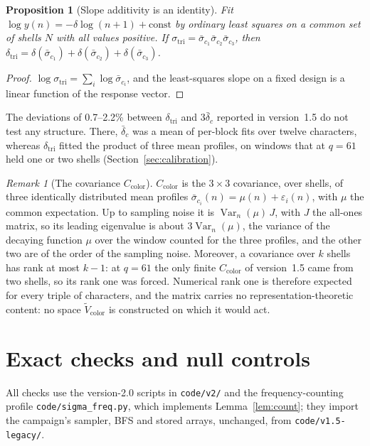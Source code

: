\documentclass[12pt,a4paper]{article}
\newtheorem{proposition}[theorem]{Proposition}
\theoremstyle{definition}
\theoremstyle{remark}
\newtheorem{remark}[theorem]{Remark}
\newcommand{\dtri}{\delta_{\mathrm{tri}}}
\newcommand{\Ccol}{C_{\mathrm{color}}}
\begin{document}
  \begin{proposition}[Slope additivity is an identity]
    \label{prop:ols}
    Fit $\log y(n)=-\delta\log(n+1)+\mathrm{const}$ by ordinary least squares on a common set of
    shells $N$ with all values positive.
    If $\sigma_{\mathrm{tri}}=\bar\sigma_{c_1}\bar\sigma_{c_2}\bar\sigma_{c_3}$, then
    $\dtri=\delta(\bar\sigma_{c_1})+\delta(\bar\sigma_{c_2})+\delta(\bar\sigma_{c_3})$.
  \end{proposition}

  \begin{proof}
    $\log\sigma_{\mathrm{tri}}=\sum_i\log\bar\sigma_{c_i}$, and the least-squares slope on a fixed
    design is a linear function of the response vector.
  \end{proof}

  The deviations of 0.7--2.2\% between $\dtri$ and $3\bar\delta_c$ reported in version~1.5 do
  not test any structure.
  There, $\bar\delta_c$ was a mean of per-block fits over twelve characters, whereas $\dtri$
  fitted the product of three mean profiles, on windows that at $q=61$ held one or two shells
  (Section~\ref{sec:calibration}).

  \begin{remark}[The covariance $\Ccol$]
    \label{rmk:ccol}
    $\Ccol$ is the $3\times3$ covariance, over shells, of three identically distributed mean
    profiles $\bar\sigma_{c_i}(n)=\mu(n)+\varepsilon_i(n)$, with $\mu$ the common expectation.
    Up to sampling noise it is $\operatorname{Var}_n(\mu)\,J$, with $J$ the all-ones matrix, so its
    leading eigenvalue is about $3\operatorname{Var}_n(\mu)$, the variance of the decaying function
    $\mu$ over the window counted for the three profiles, and the other two are of the order of the
    sampling noise.
    Moreover, a covariance over $k$ shells has rank at most $k-1$: at $q=61$ the only finite
    $\Ccol$ of version~1.5 came from two shells, so its rank one was forced.
    Numerical rank one is therefore expected for every triple of characters, and the matrix carries
    no representation-theoretic content: no space $\tilde V_{\mathrm{color}}$ is constructed on
    which it would act.
  \end{remark}

  \section{Exact checks and null controls}
  \label{sec:numerics}

  All checks use the version-2.0 scripts in \texttt{code/v2/} and the frequency-counting profile
  \texttt{code/sigma\_freq.py}, which implements Lemma~\ref{lem:count}; they import the campaign's
  sampler, BFS and stored arrays, unchanged, from \texttt{code/v1.5-legacy/}.
\end{document}

